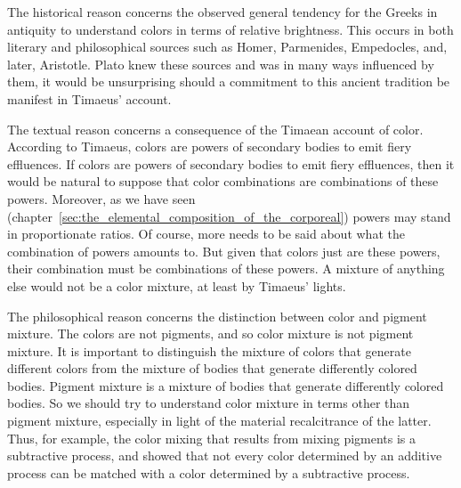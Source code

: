 The historical reason concerns the observed general tendency for the Greeks in antiquity to understand colors in terms of relative brightness. This occurs in both literary and philosophical sources such as Homer, Parmenides, Empedocles, and, later, Aristotle. Plato knew these sources and was in many ways influenced by them, it would be unsurprising should a commitment to this ancient tradition be manifest in Timaeus' account.

The textual reason concerns a consequence of the Timaean account of color. According to Timaeus, colors are powers of secondary bodies to emit fiery effluences. If colors are powers of secondary bodies to emit fiery effluences, then it would be natural to suppose that color combinations are combinations of these powers. Moreover, as we have seen (chapter~\ref{sec:the_elemental_composition_of_the_corporeal}) powers may stand in proportionate ratios. Of course, more needs to be said about what the combination of powers amounts to. But given that colors just are these powers, their combination must be combinations of these powers. A mixture of anything else would not be a color mixture, at least by Timaeus' lights.

The philosophical reason concerns the distinction between color and pigment mixture. The colors are not pigments, and so color mixture is not pigment mixture. It is important to distinguish the mixture of colors that generate different colors from the mixture of bodies that generate differently colored bodies. Pigment mixture is a mixture of bodies that generate differently colored bodies. So we should try to understand color mixture in terms other than pigment mixture, especially in light of the material recalcitrance of the latter. Thus, for example, the color mixing that results from mixing pigments is a subtractive process, and \citet{Helmholtz:1852ab} showed that not every color determined by an additive process can be matched with a color determined by a subtractive process. 

